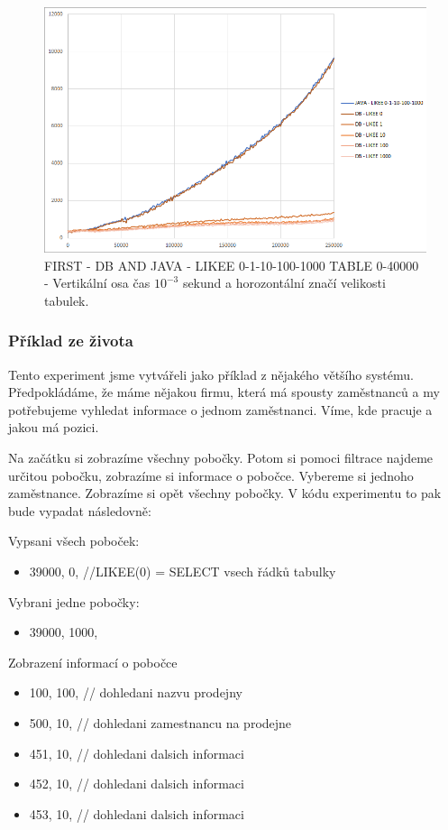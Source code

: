 \documentclass[a4paper, 11pt]{article}
\begin{document}
\begin{figure}[H]
\centering
\includegraphics[width=150mm, frame]{images/FIRST-DB-JAVA-INTERSECTION.png}
\caption{FIRST - DB AND JAVA - LIKEE 0-1-10-100-1000 TABLE 0-40000 - Vertikální osa čas $10^{-3}$ sekund a horozontální značí velikosti tabulek.}
\label{sec:obr4}
\end{figure}


	
\subsubsection{Příklad ze života}
Tento experiment jsme vytvářeli jako příklad z nějakého většího systému. Předpokládáme, že máme nějakou firmu, která má spousty zaměstnanců a my potřebujeme vyhledat informace o jednom zaměstnanci. Víme, kde pracuje a jakou má pozici.
 
Na začátku si zobrazíme všechny pobočky. %
Potom si pomoci filtrace najdeme určitou pobočku, zobrazíme si informace o pobočce. Vybereme si jednoho zaměstnance. Zobrazíme si opět všechny pobočky.
V kódu experimentu to pak bude vypadat následovně:
  

Vypsani všech poboček:
\begin{itemize}
\item     {39000, 0},  //LIKEE(0) = SELECT vsech řádků tabulky
\end{itemize}

Vybrani jedne pobočky:
\begin{itemize}
\item {39000, 1000}, 
\end{itemize}

Zobrazení informací o pobočce
\begin{itemize}
\item     {100, 100},             // dohledani nazvu prodejny
\item     {500, 10},              // dohledani zamestnancu na prodejne
\item     {451, 10},              // dohledani dalsich informaci
\item     {452, 10},              // dohledani dalsich informaci
\item     {453, 10},              // dohledani dalsich informaci
\end{itemize}
\end{document}
